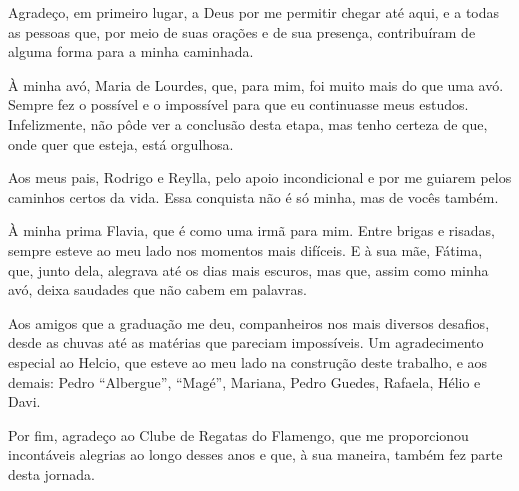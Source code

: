 Agradeço, em primeiro lugar, a Deus por me permitir chegar até aqui, e a todas as pessoas que, por meio de suas orações e de sua presença, contribuíram de alguma forma para a minha caminhada.

À minha avó, Maria de Lourdes, que, para mim, foi muito mais do que uma avó. Sempre fez o possível e o impossível para que eu continuasse meus estudos. Infelizmente, não pôde ver a conclusão desta etapa, mas tenho certeza de que, onde quer que esteja, está orgulhosa.

Aos meus pais, Rodrigo e Reylla, pelo apoio incondicional e por me guiarem pelos caminhos certos da vida. Essa conquista não é só minha, mas de vocês também.

À minha prima Flavia, que é como uma irmã para mim. Entre brigas e risadas, sempre esteve ao meu lado nos momentos mais difíceis. E à sua mãe, Fátima, que, junto dela, alegrava até os dias mais escuros, mas que, assim como minha avó, deixa saudades que não cabem em palavras.

Aos amigos que a graduação me deu, companheiros nos mais diversos desafios, desde as chuvas até as matérias que pareciam impossíveis. Um agradecimento especial ao Helcio, que esteve ao meu lado na construção deste trabalho, e aos demais: Pedro ``Albergue'', ``Magé'', Mariana, Pedro Guedes, Rafaela, Hélio e Davi.

Por fim, agradeço ao Clube de Regatas do Flamengo, que me proporcionou incontáveis alegrias ao longo desses anos e que, à sua maneira, também fez parte desta jornada.
